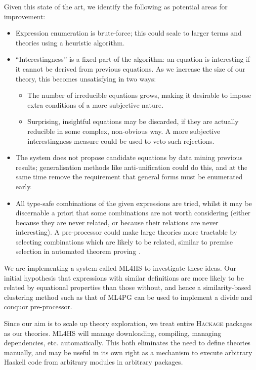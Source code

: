 \documentclass{eceasst}
\providecommand{\tightlist}{%
  \setlength{\itemsep}{0pt}\setlength{\parskip}{0pt}}
\begin{document}
Given this state of the art, we identify the following as potential
areas for improvement:

\begin{itemize}
\tightlist
\item
  Expression enumeration is brute-force; this could scale to larger
  terms and theories using a heuristic algorithm.
\item
  ``Interestingness'' is a fixed part of the algorithm: an equation is
  interesting if it cannot be derived from previous equations. As we
  increase the size of our theory, this becomes unsatisfying in two
  ways:

  \begin{itemize}
  \tightlist
  \item
    The number of irreducible equations grows, making it desirable to
    impose extra conditions of a more subjective nature.
  \item
    Surprising, insightful equations may be discarded, if they are
    actually reducible in some complex, non-obvious way. A more
    subjective interestingness measure could be used to veto such
    rejections.
  \end{itemize}
\item
  The system does not propose candidate equations by data mining
  previous results; generalisation methods like anti-unification could
  do this, and at the same time remove the requirement that general
  forms must be enumerated early.
\item
  All type-safe combinations of the given expressions are tried, whilst
  it may be discernable a priori that some combinations are not worth
  considering (either because they are never related, or because their
  relations are never interesting). A pre-processor could make large
  theories more tractable by selecting combinations which are likely to
  be related, similar to premise selection in automated theorem proving
  \cite{kuhlwein2012overview}.
\end{itemize}

We are implementing a system called \textsc{ML4HS} to investigate these
ideas. Our initial hypothesis that expressions with similar definitions
are more likely to be related by equational properties than those
without, and hence a similarity-based clustering method such as that of
\textsc{ML4PG} \cite{journals/corr/abs-1302-6421} can be used to implement
a divide and conquor pre-processor.

Since our aim is to scale up theory exploration, we treat entire
\textsc{Hackage} packages as our theories. \textsc{ML4HS} will manage
downloading, compiling, managing dependencies, etc. automatically. This
both eliminates the need to define theories manually, and may be useful
in its own right as a mechanism to execute arbitrary Haskell code from
arbitrary modules in arbitrary packages.
\end{document}
